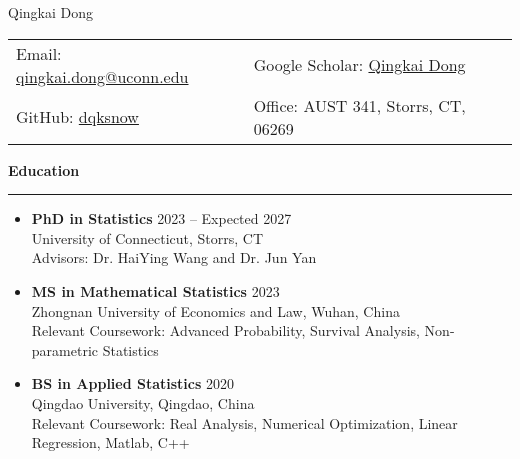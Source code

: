 \documentclass[a4paper,10pt]{article}
\newcommand{\resheading}[1]{
  \vspace{8pt}
  \noindent\textbf{\large #1}
  \vspace{4pt}
  \hrule
  \vspace{8pt}
}
\begin{document}
\begin{center}
    {\LARGE Qingkai Dong} \\
    \vspace{5pt}
    \begin{tabular}{ll}
      Email: \href{mailto:qingkai.dong@uconn.edu}{qingkai.dong@uconn.edu} &  Google Scholar: \href{https://scholar.google.com/citations?user=mojHlF4AAAAJ&hl=en&oi=ao}{Qingkai Dong} \\  GitHub: \href{https://github.com/dqksnow}{dqksnow} 
      &   Office: AUST 341, Storrs, CT, 06269 \\
    \end{tabular}
  \end{center}
  
\resheading{Education}
\begin{itemize}[left=0pt, label={}]
    \item \textbf{PhD in Statistics} \hfill 2023 -- Expected 2027 \\
    University of Connecticut, Storrs, CT \\
    Advisors: Dr. HaiYing Wang and Dr. Jun Yan
    
    \item \textbf{MS in Mathematical Statistics} \hfill 2023 \\
    Zhongnan University of Economics and Law, Wuhan, China \\
    Relevant Coursework: Advanced Probability, Survival Analysis, Non-parametric Statistics
    
    \item \textbf{BS in Applied Statistics} \hfill 2020 \\
    Qingdao University, Qingdao, China \\
    Relevant Coursework: Real Analysis, Numerical
Optimization, Linear Regression, Matlab, C++
\end{itemize}
\end{document}
